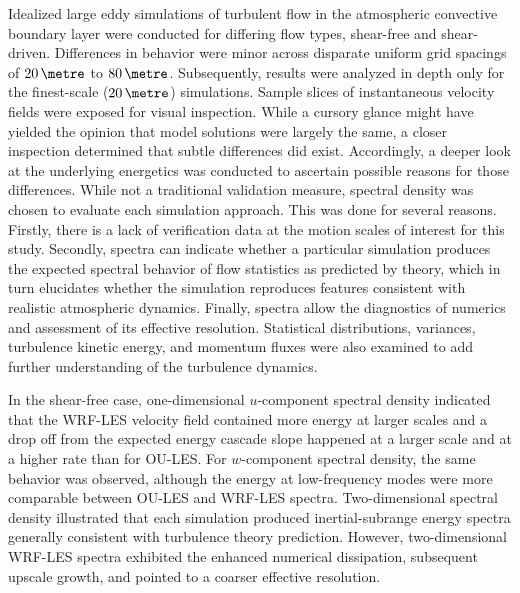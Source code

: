 Idealized large eddy simulations of turbulent flow in the atmospheric convective boundary layer were conducted for differing flow types, shear-free and shear-driven. Differences in behavior were minor across disparate uniform grid spacings of $20\, \metre$ to $80\, \metre$. Subsequently, results were analyzed in depth only for the finest-scale ($20\, \metre$) simulations. Sample slices of instantaneous velocity fields were exposed for visual inspection. While a cursory glance might have yielded the opinion that model solutions were largely the same, a closer inspection determined that subtle differences did exist. Accordingly, a deeper look at the underlying energetics was conducted to ascertain possible reasons for those differences. While not a traditional validation measure, spectral density was chosen to evaluate each simulation approach. This was done for several reasons. Firstly, there is a lack of verification data at the motion scales of interest for this study. Secondly, spectra can indicate whether a particular simulation produces the expected spectral behavior of flow statistics as predicted by theory, which in turn elucidates whether the simulation reproduces features consistent with realistic atmospheric dynamics. Finally, spectra allow the diagnostics of numerics and assessment of its effective resolution. Statistical distributions, variances, turbulence kinetic energy, and momentum fluxes were also examined to add further understanding of the turbulence dynamics.

In the shear-free case, one-dimensional $u$-component spectral density indicated that the WRF-LES velocity field contained more energy at larger scales and a drop off from the expected energy cascade slope happened at a larger scale and at a higher rate than for OU-LES. For $w$-component spectral density, the same behavior was observed, although the energy at low-frequency modes were more comparable between OU-LES and WRF-LES spectra. Two-dimensional spectral density illustrated that each simulation produced inertial-subrange energy spectra generally consistent with turbulence theory prediction. However, two-dimensional WRF-LES spectra exhibited the enhanced numerical dissipation, subsequent upscale growth, and pointed to a coarser effective resolution. 

